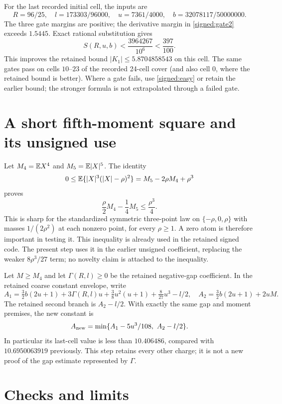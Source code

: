 For the last recorded initial cell, the inputs are
\[
 R=96/25,\quad l=173303/96000,\quad u=7361/4000,
 \quad b=32078117/50000000.
\]
The three gate margins are positive; the derivative margin in
\eqref{signed:gate2} exceeds $1.5445$.
Exact rational substitution gives
\[
 S(R,u,b)<\frac{3964267}{10^6}<\frac{397}{100}.
\]
This improves the retained bound $|K_1|\le5.8704858543$ on this cell.
The same gates pass on cells $10$--$23$ of the recorded 24-cell cover
(and also cell $0$, where the retained bound is better).
Where a gate fails, use \eqref{signed:easy} or retain the earlier bound;
the stronger formula is not extrapolated through a failed gate.

\section{A short fifth-moment square and its unsigned use}

Let $M_4=\mathbb E X^4$ and $M_5=\mathbb E|X|^5$. The identity
\[
 0\le\mathbb E\{|X|^3(|X|-\rho)^2\}
 =M_5-2\rho M_4+\rho^3
\]
proves
\begin{equation}\label{signed:fifth}
 \frac\rho2M_4-\frac14M_5\le\frac{\rho^3}{4}.
\end{equation}
This is sharp for the standardized symmetric three-point law on
$\{-\rho,0,\rho\}$ with masses $1/(2\rho^2)$ at each nonzero point,
for every $\rho\ge1$. A zero atom is therefore important in testing it.
This inequality is already used in the retained signed code. The present
step uses it in the earlier unsigned coefficient, replacing the weaker
$8\rho^3/27$ term; no novelty claim is attached to the inequality.

Let $M\ge M_4$ and let $\Gamma(R,l)\ge0$ be the retained negative-gap
coefficient. In the retained coarse constant envelope, write
\[
 A_1=\tfrac32b(2u+1)+3\Gamma(R,l)u
       +\tfrac38u^2(u+1)+\tfrac8{27}u^3-l/2,
 \quad A_2=\tfrac32b(2u+1)+2uM.
\]
The retained second branch is $A_2-l/2$. With exactly the same gap and
moment premises, the new constant is
\begin{equation}\label{signed:A}
 A_{\rm new}=\min\{A_1-5u^3/108,\ A_2-l/2\}.
\end{equation}
In particular its last-cell value is less than $10.406486$, compared
with $10.6950063919$ previously. This step retains every other charge;
it is not a new proof of the gap estimate represented by $\Gamma$.

\section{Checks and limits}

